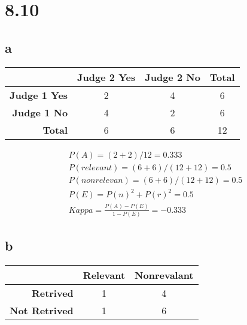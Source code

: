 \documentclass[11pt]{article} %
\begin{document}
\section*{8.10}

\subsection*{a}

\begin{table}[h]
    \begin{center}
        \begin{tabular}{r|c|c|c|}
            \textbf{} & \textbf{Judge 2 Yes} & \textbf{Judge 2 No} & \textbf{Total}\\
            \hline
            \textbf{Judge 1 Yes} & 2 & 4 & 6\\
            \textbf{Judge 1 No} & 4 & 2 & 6\\
            \textbf{Total} & 6 & 6 & 12\\
        \end{tabular}
    \end{center}
\end{table}

\begin{align*}
    P(A) = (2+2)/12 = 0.333\\
    P(relevant) = (6 + 6)/(12 + 12) = 0.5\\
    P(nonrelevan) = (6 + 6)/(12 + 12) = 0.5\\
    P(E) = P(n)^2 + P(r)^2 = 0.5\\
    Kappa = \frac{P(A) - P(E)}{1 - P(E)} = -0.333
\end{align*}

\subsection*{b}

\begin{table}[h]
    \begin{center}
        \begin{tabular}{r|c|c|}
            & \textbf{Relevant} & \textbf{Nonrevalant}\\
            \hline
            \textbf{Retrived} & 1 & 4\\
            \textbf{Not Retrived} & 1 & 6\\
        \end{tabular}
    \end{center}
\end{table}
\end{document}
